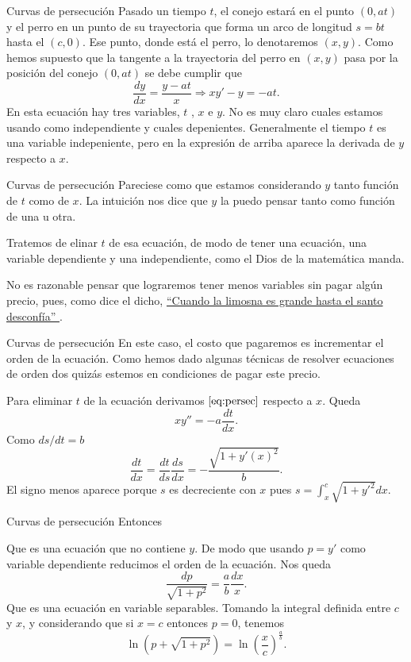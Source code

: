 \documentclass[handout,hyperref={colorlinks=true}]{beamer}
\begin{document}
\begin{frame}{Curvas de persecución}
Pasado un tiempo $t$, el conejo estará en el punto $(0,at)$ y el perro en un punto de su trayectoria que forma un arco de
 longitud $s=bt$ hasta el $(c,0)$. Ese punto, donde está el perro, lo denotaremos $(x,y)$. Como hemos supuesto que la tangente a la trayectoria del perro en $(x,y)$ pasa 
 por la posición del conejo $(0,at)$ se debe cumplir que
 \begin{equation}\label{eq:persec}\frac{dy}{dx}=\frac{y-at}{x}\Longrightarrow xy'-y=-at.\end{equation}
 En esta ecuación hay tres variables, $t$ , $x$ e $y$. No es muy claro cuales estamos usando como independiente y cuales depenientes. 
 Generalmente el tiempo $t$ es una variable  indepeniente, pero en la expresión de arriba aparece la derivada de $y$ respecto a $x$. 
\end{frame}

\begin{frame}{Curvas de persecución}
  Pareciese como 
 que estamos considerando   $y$ tanto función de $t$ como de $x$. La intuición nos dice que $y$ la puedo pensar tanto como función de una u otra.
 
 Tratemos de elinar $t$ de esa ecuación, de modo de tener una ecuación, una variable dependiente y una independiente, como el Dios de la matemática manda.
 
  No es razonable pensar que lograremos tener menos variables sin pagar algún precio, pues, como dice el dicho, 
 \href{http://es.answers.yahoo.com/question/index?qid=20081023132736AABMX0}{``Cuando la limosna es grande hasta el santo desconfía'' }. 
\end{frame}

\begin{frame}{Curvas de persecución}
 En este caso, el costo que pagaremos 
 es incrementar el orden de la ecuación. 
 Como hemos dado algunas técnicas de  resolver ecuaciones de orden dos quizás estemos en condiciones de pagar este precio.
 
Para eliminar $t$ de la ecuación derivamos $\eqref{eq:persec}$ respecto a $x$. Queda
\[xy''=-a\frac{dt}{dx}.\]
Como $ds/dt=b$ 
\[\frac{dt}{dx}=\frac{dt}{ds}\frac{ds}{dx}=-\frac{\sqrt{1+y'(x)^2}}{b}.\]
El signo menos aparece porque $s$ es decreciente con $x$ pues $s=\int_x^c\sqrt{1+y'^2}dx$.
 
\end{frame}

\begin{frame}{Curvas de persecución}
 Entonces 
 
Que es una ecuación que no contiene $y$. De modo que usando $p=y'$ como variable dependiente reducimos el orden de la ecuación. Nos queda
\[\frac{dp}{\sqrt{1+p^2}}=\frac{a}{b}\frac{dx}{x}.\]
Que es una ecuación en variable separables. Tomando la integral definida entre $c$ y $x$, y considerando que si $x=c$ entonces $p=0$, tenemos
\[\ln\left(p+\sqrt{1+p^2}\right)=\ln\left( \frac{x}{c}\right)^{\tfrac{a}{b}}.\]
 
 
\end{frame}
\end{document}
